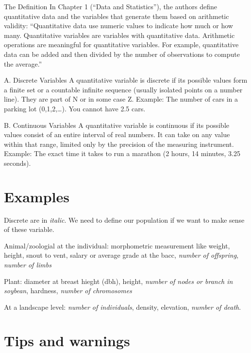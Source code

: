 \documentclass[
  letterpaper,
  DIV=11,
  numbers=noendperiod]{scrreprt}
\begin{document}
The Definition In Chapter 1 (``Data and Statistics''), the authors
define quantitative data and the variables that generate them based on
arithmetic validity: ``Quantitative data use numeric values to indicate
how much or how many. Quantitative variables are variables with
quantitative data. Arithmetic operations are meaningful for quantitative
variables. For example, quantitative data can be added and then divided
by the number of observations to compute the average.''

A. Discrete Variables A quantitative variable is discrete if its
possible values form a finite set or a countable infinite sequence
(usually isolated points on a number line). They are part of N or in
some case Z. Example: The number of cars in a parking lot
(0,1,2,\ldots). You cannot have 2.5 cars.

B. Continuous Variables A quantitative variable is continuous if its
possible values consist of an entire interval of real numbers. It can
take on any value within that range, limited only by the precision of
the measuring instrument. Example: The exact time it takes to run a
marathon (2 hours, 14 minutes, 3.25 seconds).

\section*{Examples}\label{examples-15}


Discrete are in \emph{italic}. We need to define our population if we
want to make sense of these variable.

Animal/zoologial at the individual: morphometric measurement like
weight, height, snout to vent, salary or average grade at the bacc,
\emph{number of offspring}, \emph{number of limbs}

Plant: diameter at breast hieght (dbh), height, \emph{number of nodes or
branch in soybean}, hardness, \emph{number of chromosomes}

At a landscape level: \emph{number of individuals}, density, elevation,
\emph{number of death}.

\section*{Tips and warnings}\label{tips-and-warnings-9}

\end{document}

